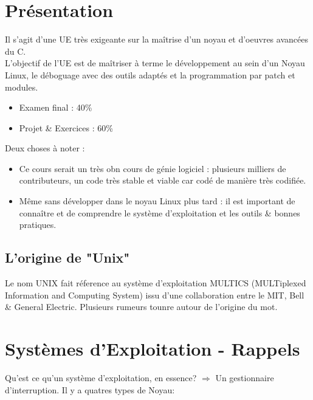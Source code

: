 \section{Présentation}

Il s'agit d'une UE très exigeante sur la maîtrise d'un noyau et d'oeuvres avancées
du C.\\
L'objectif de l'UE est de maîtriser à terme le développement au sein d'un Noyau
Linux, le déboguage avec des outils adaptés et la programmation par patch et
modules.

\begin{itemize}
  \item Examen final : 40\%
  \item Projet \& Exercices : 60\%
\end{itemize}

Deux choses à noter :
\begin{itemize}
  \item Ce cours serait un très obn cours de génie logiciel : plusieurs milliers de
contributeurs, un code très stable et viable car codé de manière très codifiée.
  \item Même sans développer dans le noyau Linux plus tard : il est important de
connaître et de comprendre le système d'exploitation et les outils \& bonnes
pratiques.
\end{itemize}

\subsection{L'origine de "Unix"}
Le nom UNIX fait réference au syst\`eme d'exploitation MULTICS (MULTiplexed
Information and Computing System) issu d'une collaboration entre le MIT, Bell
\& General Electric.
Plusieurs rumeurs tounre autour de l'origine du mot.\\

\section{Systèmes d'Exploitation - Rappels}
Qu'est ce qu'un système d'exploitation, en essence? $\Rightarrow$ Un gestionnaire
d'interruption.
Il y a quatres types de Noyau:

